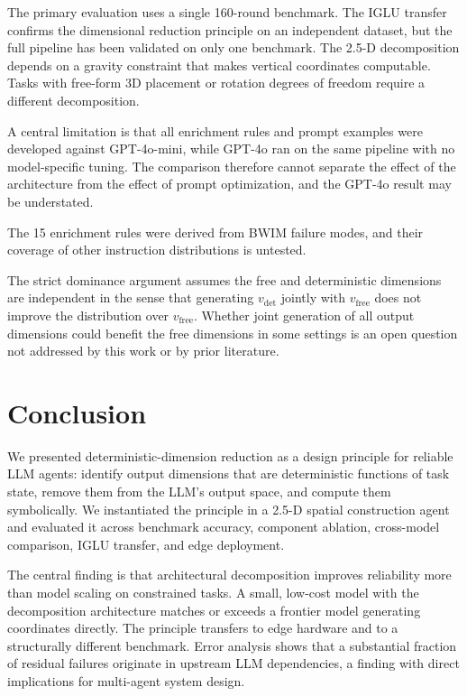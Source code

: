 \documentclass[10pt]{article}
\begin{document}
The primary evaluation uses a single 160-round benchmark. The IGLU
transfer confirms the dimensional reduction principle on an independent
dataset, but the full pipeline has been validated on only one benchmark.
The 2.5-D decomposition depends on a gravity constraint that makes
vertical coordinates computable. Tasks with free-form 3D placement or
rotation degrees of freedom require a different decomposition.

A central limitation is that all enrichment rules and prompt examples were
developed against GPT-4o-mini, while GPT-4o ran on the same pipeline with
no model-specific tuning. The comparison therefore cannot separate the
effect of the architecture from the effect of prompt optimization, and the
GPT-4o result may be understated.

The 15 enrichment rules were derived from BWIM failure modes, and their
coverage of other instruction distributions is untested.

The strict dominance argument assumes the free and deterministic
dimensions are independent in the sense that generating $v_\mathrm{det}$
jointly with $v_\mathrm{free}$ does not improve the distribution over
$v_\mathrm{free}$. Whether joint generation of all output dimensions
could benefit the free dimensions in some settings is an open question
not addressed by this work or by prior literature.

\section{Conclusion}

We presented deterministic-dimension reduction as a design principle for
reliable LLM agents: identify output dimensions that are deterministic
functions of task state, remove them from the LLM's output space, and
compute them symbolically. We instantiated the principle in a 2.5-D
spatial construction agent and evaluated it across benchmark accuracy,
component ablation, cross-model comparison, IGLU transfer, and edge
deployment.

The central finding is that architectural decomposition improves
reliability more than model scaling on constrained tasks. A small,
low-cost model with the decomposition architecture matches or exceeds a
frontier model generating coordinates directly. The principle transfers
to edge hardware and to a structurally different benchmark. Error analysis
shows that a substantial fraction of residual failures originate in
upstream LLM dependencies, a finding with direct implications for
multi-agent system design.
\end{document}
